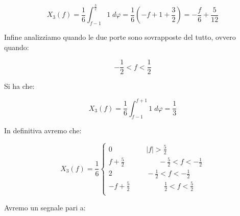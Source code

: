 \documentclass[../main.tex]{subfiles}
\begin{document}
\begin{equation}
	X_3(f) = \frac{1}{6} \int^{\frac{3}{2}}_{f - 1} 1 \; d\varphi = \frac{1}{6} \left( - f + 1 + \frac{3}{2} \right) = - \frac{f}{6} + \frac{5}{12}
\end{equation}

Infine analizziamo quando le due porte sono sovrapposte del tutto, ovvero quando:

\begin{equation}
	- \frac{1}{2} < f < \frac{1}{2}
\end{equation}

Si ha che:

\begin{equation}
	X_3(f) = \frac{1}{6} \int^{f+1}_{f - 1} 1 \; d\varphi = \frac{1}{3}
\end{equation}

In definitiva avremo che:

\begin{equation}
X_3(f) = \frac{1}{6}
\begin{cases}
	0 \hspace{2cm} |f| > \frac{5}{2}\\
	f + \frac{5}{2} \hspace{2cm} -\frac{5}{2} < f < - \frac{1}{2}\\
	2 \hspace{2cm} -\frac{1}{2} < f < - \frac{1}{2}\\
	-f + \frac{5}{2}  \hspace{2cm}     \frac{1}{2} < f < \frac{5}{2}\\	
\end{cases}	
\end{equation}

Avremo un segnale pari a:
\end{document}
